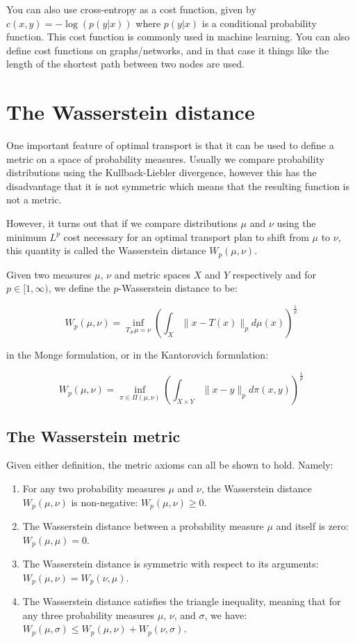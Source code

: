 You can also use cross-entropy as a cost function, given by $c(x,y) = -\log(p(y|x))$ where $p(y|x)$ is a conditional probability function. This cost function is commonly used in machine learning. You can also define cost functions on graphs/networks, and in that case it things like the length of the shortest path between two nodes are used.

\section{The Wasserstein distance}

One important feature of optimal transport is that it can be used to define a metric on a space of probability measures. Usually we compare probability distributions using the Kullback-Liebler divergence, however this has the disadvantage that it is not symmetric which means that the resulting function is not a metric.

However, it turns out that if we compare distributions $\mu$ and $\nu$ using the minimum $L^p$ cost necessary for an optimal transport plan to shift from $\mu$ to $\nu$, this quantity is called the Wasserstein distance $W_p(\mu, \nu)$.

\begin{definition}

Given two measures $\mu$, $\nu$ and metric spaces $X$ and $Y$ respectively and for $p \in [1, \infty)$, we define the $p$-Wasserstein distance to be:

$$W_p(\mu, \nu) = \inf_{T_\# \mu = \nu} \left(\int_X \|x-T(x)\|_p d\mu(x) \right)^{\frac{1}{p}}$$

in the Monge formulation, or in the Kantorovich formulation:

$$W_p(\mu, \nu) = \inf_{\pi \in \Pi(\mu,\nu)} \left( \int_{X \times Y} \|x-y\|_p d\pi(x,y) \right)^{\frac{1}{p}}$$

\end{definition}

\subsection{The Wasserstein metric}

Given either definition, the metric axioms can all be shown to hold. Namely:

\begin{enumerate}
\item For any two probability measures $\mu$ and $\nu$, the Wasserstein distance $W_p(\mu, \nu)$ is non-negative: $W_p(\mu, \nu) \geq 0$.
\item The Wasserstein distance between a probability measure $\mu$ and itself is zero: $W_p(\mu, \mu) = 0$.
\item The Wasserstein distance is symmetric with respect to its arguments: $W_p(\mu, \nu) = W_p(\nu, \mu)$.
\item The Wasserstein distance satisfies the triangle inequality, meaning that for any three probability measures $\mu$, $\nu$, and $\sigma$, we have: $W_p(\mu, \sigma) \leq W_p(\mu, \nu) + W_p(\nu, \sigma)$.
\end{enumerate}

